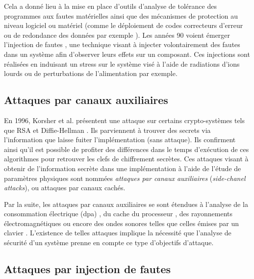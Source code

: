             Cela a donné lieu à la mise en place d'outils d'analyse de tolérance des programmes aux fautes matérielles \cite{Segall/FTCS88, Kanawati/FTCS92} ainsi que des mécanismes de protection au niveau logiciel ou matériel (comme le déploiement de codes correcteurs d'erreur ou de redondance des données par exemple \cite{Wu/17}). 
            Les années 90 voient émerger l'injection de fautes \cite{karlsson1994using, clark1995fault}, une technique visant à injecter volontairement des fautes dans un système afin d'observer leurs effets sur un composant. Ces injections sont réalisées en induisant un stress sur le système visé à l'aide de radiations d'ions lourds ou de perturbations de l'alimentation par exemple.
            
        \subsection{Attaques par canaux auxiliaires}
            
            En 1996, Korsher et al. \cite{Kocher/96TA} présentent une attaque sur certains crypto-systèmes tels que RSA \cite{Rivest/78RSA} et Diffie-Hellman \cite{Diffie/76}. Ils parviennent à trouver des secrets via l'information que laisse fuiter l'implémentation (sans attaque). Ils confirment ainsi qu'il est possible de profiter des différences dans le temps d'exécution de ces algorithmes pour retrouver les clefs de chiffrement secrètes.
            Ces attaques visant à obtenir de l'information secrète dans une implémentation à l'aide de l'étude de paramètres physiques sont nommées \textit{attaques par canaux auxiliaires} (\textit{side-chanel attacks}), ou attaques par canaux cachés. 
            
            Par la suite, les attaques par canaux auxiliaires se sont étendues à l'analyse de la consommation électrique (\gls{dpa}) \cite{Kocher/99DPA, Korcher/11}, du cache du processeur \cite{Tiri/DAC07}, des rayonnements électromagnétiques \cite{Pandolfi/CHES01} ou encore des ondes sonores telles que celles émises par un clavier \cite{Asonov/SSP04, Gupta/JCS18}.
            L'existence de telles attaques implique la nécessité que l'analyse de sécurité d'un système prenne en compte ce type d'objectifs d'attaque. 
            
        \subsection{Attaques par injection de fautes}
            
